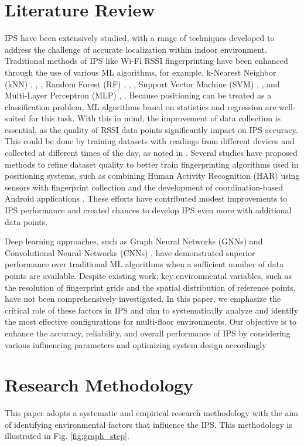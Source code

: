 \documentclass[conference]{IEEEtran}
\begin{document}
	\section{Literature Review}
	IPS have been extensively studied, with a range of techniques developed to address the challenge of accurate localization within indoor environment. Traditional methods of IPS like Wi-Fi RSSI fingerprinting have been enhanced through the use of various ML algorithms, for example, k-Nearest Neighbor (kNN) \cite{LRE1}, \cite{LRE2}, \cite{LRE6}, Random Forest (RF) \cite{LRE1}, \cite{LRE6}, \cite{LRE5}, Support Vector Machine (SVM) \cite{LRE1}, \cite{LRE2}, \cite{LRE6} and Multi-Layer Perceptron (MLP) \cite{LRE1}, \cite{LRE2}. Because positioning can be treated as a classification problem,  ML algorithms based on statistics and regression are well-suited for this task. With this in mind, the improvement of data collection is essential, as the quality of RSSI data points significantly impact on IPS accuracy. This could be done by training datasets with readings from different devices and collected at different times of the day, as noted in \cite{LRE3}. Several studies have proposed methods to refine dataset quality to better train fingerprinting algorithms used in positioning systems, such as combining Human Activity Recognition (HAR) using sensors with fingerprint collection \cite{LRE4} and the development of coordination-based Android applications \cite{LRE7}. These efforts have contributed modest improvements to IPS performance and created chances to develop IPS even more with additional data points. 
	
	Deep learning approaches, such as Graph Neural Networks (GNNs) \cite{LRE2} and Convolutional Neural Networks (CNNs) \cite{LRE4}, have demonstrated superior performance over traditional ML algorithms when a sufficient number of data points are available. Despite existing work, key environmental variables, such as the resolution of fingerprint grids and the spatial distribution of reference points, have not been comprehensively investigated. In this paper, we emphasize the critical role of these factors in IPS and aim to systematically analyze and identify the most effective configurations for multi-floor environments. Our objective is to enhance the accuracy, reliability, and overall performance of IPS by considering various influencing parameters and optimizing system design accordingly
	
	
	
	\section{Research Methodology}
	This paper adopts a systematic and empirical research methodology with the aim of identifying environmental factors that influence the IPS. This methodology is illustrated in Fig. \ref{fig:graph_step}.
	
\end{document}
